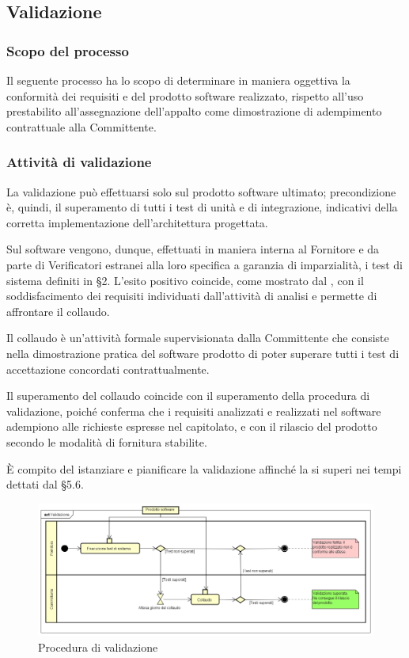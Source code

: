 \subsection{Validazione} \label{validazione}

	\subsubsection{Scopo del processo}
		Il seguente processo ha lo scopo di determinare in maniera oggettiva la conformità dei requisiti e
		del prodotto software realizzato, rispetto all'uso prestabilito all'assegnazione dell'appalto come
		dimostrazione di adempimento contrattuale alla Committente.

	\subsubsection{Attività di validazione}
		La validazione può effettuarsi solo sul prodotto software ultimato; precondizione è, quindi, il
		superamento di tutti i test di unità e di integrazione, indicativi della corretta implementazione
		dell'architettura progettata.

		Sul software vengono, dunque, effettuati in maniera interna al Fornitore e da parte di Verificatori
		estranei alla loro specifica a garanzia di imparzialità, i test di sistema definiti in \vPianoDiQualifica{} §2.
		L'esito positivo coincide, come mostrato dal , con il soddisfacimento dei
		requisiti individuati dall'attività di analisi e permette di affrontare il collaudo.

		Il collaudo è un'attività formale supervisionata dalla Committente che consiste nella dimostrazione
		pratica del software prodotto di poter superare tutti i test di accettazione concordati contrattualmente.

		Il superamento del collaudo coincide con il superamento della procedura di validazione, poiché conferma
		che i requisiti analizzati e realizzati nel software adempiono alle richieste espresse nel capitolato, e con il
		rilascio del prodotto secondo le modalità di fornitura stabilite.

		È compito del \Responsabile{} istanziare e pianificare la validazione affinché la si superi nei tempi dettati
		dal \vPianoDiProgetto{} §5.6.

		\begin{figure}[htbp]
			\centering
			\includegraphics[scale=0.35]{./img/validazione.png}
			\caption[Procedura di validazione]{Procedura di validazione}
		\end{figure}\\